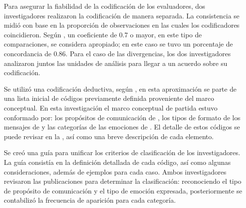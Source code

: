 \documentclass{textolivre}
\begin{document}
Para asegurar la fiabilidad de la codificación de los evaluadores, dos investigadores realizaron la codificación de manera separada. La consistencia se midió con base en la proporción de observaciones en las cuales los codificadores coincidieron. Según \textcite{neuendorf2002}, un coeficiente de 0.7 o mayor, en este tipo de comparaciones, se considera apropiado; en este caso se tuvo un porcentaje de concordancia de 0.86. Para el caso de las divergencias, los dos investigadores analizaron juntos las unidades de análisis para llegar a un acuerdo sobre su codificación. 

Se utilizó una codificación deductiva, según \textcite{miles2013}, en esta aproximación se parte de una lista inicial de códigos previamente definida proveniente del marco conceptual. En esta investigación el marco conceptual de partida estuvo conformado por: los propósitos de comunicación de \textcite{monroe1973}, los tipos de formato de los mensajes de \textcite{pletikosaCvijikj2013} y las categorías de las emociones de \textcite{ekman1992,fredrickson2004}. El detalle de estos códigos se puede revisar en la , así como una breve descripción de cada elemento. 

Se creó una guía para unificar los criterios de clasificación de los investigadores. La guía consistía en la definición detallada de cada código, así como algunas consideraciones, además de ejemplos para cada caso. Ambos investigadores revisaron las publicaciones para determinar la clasificación: reconociendo el tipo de propósito de comunicación y el tipo de emoción expresada, posteriormente se contabilizó la frecuencia de aparición para cada categoría. 
\end{document}
